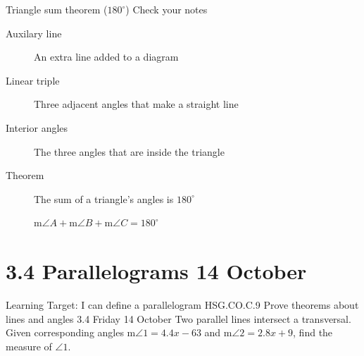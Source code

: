 \begin{frame}{Triangle sum theorem ($180^\circ$)}
  {Check your notes}
     \smallskip
  \begin{description}
    \item[Auxilary line] An extra line added to a diagram
    \item[Linear triple] Three adjacent angles that make a straight line
    \item[Interior angles] The three angles that are inside the triangle
    \item[Theorem] The sum of a triangle's angles is $180^\circ$ \par \smallskip
    m$\angle A + \text{m}\angle B + \text{m}\angle C = 180^\circ$
  \end{description}
  \end{frame}
 
\section{3.4 Parallelograms \hfill 14 October}
\begin{frame}{Learning Target: I can define a parallelogram}
  {HSG.CO.C.9 Prove theorems about lines and angles  \hfill \alert{3.4 Friday 14 October}}
  Two parallel lines intersect a transversal. Given corresponding angles  m$\angle 1 = 4.4x - 63$ and m$\angle 2 = 2.8x+9$, find the measure of $\angle 1$. 
  \begin{flushright}
    \end{flushright}
\end{frame}

